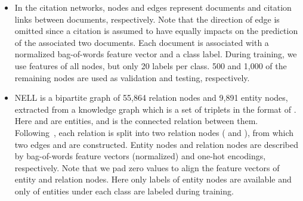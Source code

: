 \documentclass[10pt,journal,compsoc]{IEEEtran}
\begin{document}
\begin{itemize}[leftmargin=*]
    \item In the citation networks, nodes and edges represent documents and citation links between documents, respectively. Note that the direction of edge is omitted since a citation is assumed to have equally impacts on the prediction of the associated two documents. Each document is associated with a normalized bag-of-words feature vector and a class label. During training, we use features of all nodes, but only 20 labels per class. 500 and 1,000 of the remaining nodes are used as validation and testing, respectively.
    \item NELL is a bipartite graph of 55,864 relation nodes and 9,891 entity nodes, extracted from a knowledge graph which is a set of triplets in the format of . Here  and  are entities, and  is the connected relation between them. Following~\cite{kipf2017semi}, each relation  is split into two relation nodes ( and ), from which two edges  and  are constructed. Entity nodes and relation nodes are described by bag-of-words feature vectors (normalized) and one-hot encodings, respectively. Note that we pad zero values to align the feature vectors of entity and relation nodes. Here only labels of entity nodes are available and only  of entities under each class are labeled during training.
\end{itemize}
\begin{table}[]
\caption{Statistics of the experiment datasets.}
\vspace{-0.3cm}
\label{tab:dataset}
\end{table}
\end{document}
